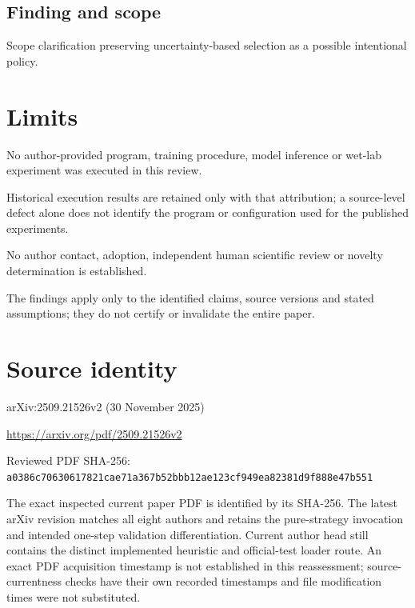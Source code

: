 \documentclass[11pt]{article}
\begin{document}
\subsection*{Finding and scope}

Scope clarification preserving uncertainty-based selection as a possible intentional policy.

\section*{Limits}

No author-provided program, training procedure, model inference or wet-lab experiment was executed in this review.\par

Historical execution results are retained only with that attribution; a source-level defect alone does not identify the program or configuration used for the published experiments.\par

No author contact, adoption, independent human scientific review or novelty determination is established.\par

The findings apply only to the identified claims, source versions and stated assumptions; they do not certify or invalidate the entire paper.\par

\section*{Source identity}

arXiv:2509.21526v2 (30 November 2025)

\url{https://arxiv.org/pdf/2509.21526v2}

Reviewed PDF SHA-256: \nolinkurl{a0386c70630617821cae71a367b52bbb12ae123cf949ea82381d9f888e47b551}

The exact inspected current paper PDF is identified by its SHA-256. The latest arXiv revision matches all eight authors and retains the pure-strategy invocation and intended one-step validation differentiation. Current author head still contains the distinct implemented heuristic and official-test loader route. An exact PDF acquisition timestamp is not established in this reassessment; source-currentness checks have their own recorded timestamps and file modification times were not substituted.
\end{document}
